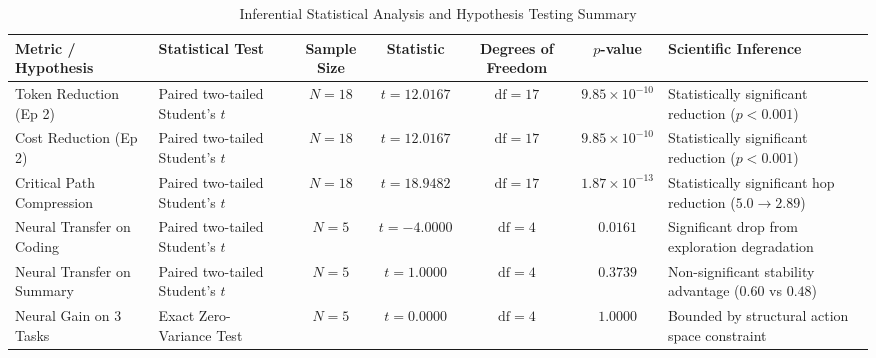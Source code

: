 \begin{table}[!t]
\centering
\caption{Inferential Statistical Analysis and Hypothesis Testing Summary}
\label{tab:statistical_testing}
\footnotesize
\begin{tabular}{llccccl}
\toprule
\textbf{Metric / Hypothesis} & \textbf{Statistical Test} & \textbf{Sample Size} & \textbf{Statistic} & \textbf{Degrees of Freedom} & \textbf{$p$-value} & \textbf{Scientific Inference} \\
\midrule
Token Reduction (Ep 2) & Paired two-tailed Student's $t$ & $N=18$ & $t = 12.0167$ & $\mathrm{df}=17$ & $9.85 \times 10^{-10}$ & Statistically significant reduction ($p < 0.001$) \\
Cost Reduction (Ep 2) & Paired two-tailed Student's $t$ & $N=18$ & $t = 12.0167$ & $\mathrm{df}=17$ & $9.85 \times 10^{-10}$ & Statistically significant reduction ($p < 0.001$) \\
Critical Path Compression & Paired two-tailed Student's $t$ & $N=18$ & $t = 18.9482$ & $\mathrm{df}=17$ & $1.87 \times 10^{-13}$ & Statistically significant hop reduction ($5.0 \to 2.89$) \\
Neural Transfer on Coding & Paired two-tailed Student's $t$ & $N=5$ & $t = -4.0000$ & $\mathrm{df}=4$ & $0.0161$ & Significant drop from exploration degradation \\
Neural Transfer on Summary & Paired two-tailed Student's $t$ & $N=5$ & $t = 1.0000$ & $\mathrm{df}=4$ & $0.3739$ & Non-significant stability advantage ($0.60$ vs $0.48$) \\
Neural Gain on 3 Tasks & Exact Zero-Variance Test & $N=5$ & $t = 0.0000$ & $\mathrm{df}=4$ & $1.0000$ & Bounded by structural action space constraint \\
\bottomrule
\end{tabular}
\end{table}
